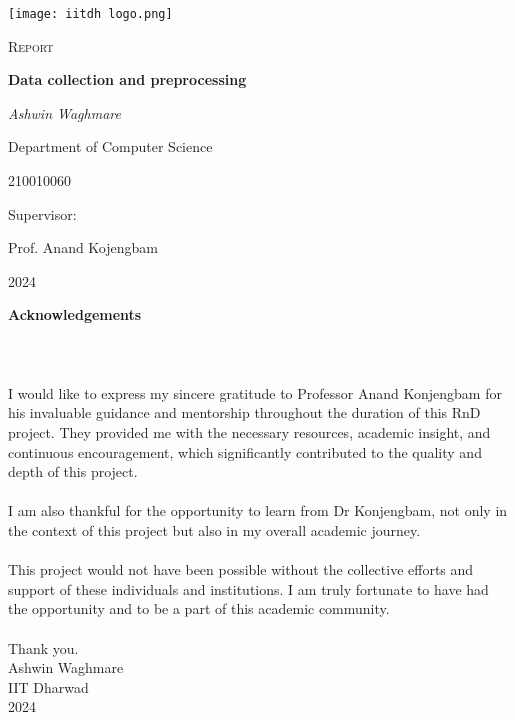 \documentclass{report}
\begin{document}
\begin{titlepage}
\addtolength{\hoffset}{-1cm}
	\centering
	\texttt{[image: iitdh logo.png]}\par\vspace{1cm}
	{\scshape\LARGE  \par}
	\vspace{1cm}
	{\scshape\Large Report \par}
	\vspace{1.5cm}
	{\huge\bfseries Data collection and preprocessing \par}
	\vspace{2cm}
	{\Large\itshape Ashwin Waghmare \par \small Department of Computer Science \par \small 210010060}
	\vfill
	\small{Supervisor:} \par
	   Prof. Anand Kojengbam 

	\vfill

	{\large 2024}
\end{titlepage}


\pagestyle{fancy}
\fancyfoot[RO]{}
\vspace*{10pt}

\textbf{\LARGE{Acknowledgements}}\\ \\ \\ 
\paragraph{}
I would like to express my sincere gratitude to Professor Anand Konjengbam for his invaluable guidance and mentorship throughout the duration of this RnD project. They provided me with the necessary resources, academic insight, and continuous encouragement, which significantly contributed to the quality and depth of this project.
\paragraph{}
I am also thankful for the opportunity to learn from Dr Konjengbam, not only in the context of this project but also in my overall academic journey.
\paragraph{}
This project would not have been possible without the collective efforts and support of these individuals and institutions. I am truly fortunate to have had the opportunity and to be a part of this academic community.
\\ \\
Thank you.\\
Ashwin Waghmare\\
IIT Dharwad\\
2024
\end{document}
